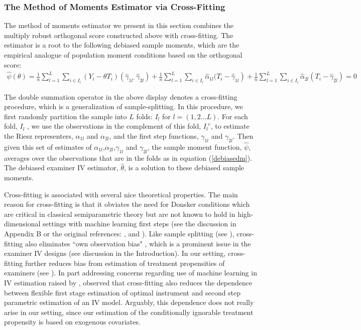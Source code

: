 \subsubsection{The Method of Moments Estimator via Cross-Fitting} \label{mom_est}
The method of moments estimator we present in this section combines the multiply robust orthogonal score constructed above with cross-fitting. The estimator is a root to the following debiased sample moments, which are the empirical analogue of population moment conditions based on the orthogonal score: 
\begin{align} \label{debiasedm}
\hat{\psi}(\theta)=\frac{1}{n} \sum_{l=1}^L \sum_{i \in I_{l}}(Y_i-\theta T_i)\left(\hat{\gamma}_{1 l^{-}}\right. \left.\hat{\gamma}_{2 l}\right)+\frac{1}{n} \sum_{l=1}^L \sum_{i \in I_{l}} \hat{\alpha}_{1 l}(T_i- \left.\hat{\gamma}_{1 l}\right)+\frac{1}{n} \sum_{l=1}^L \sum_{i \in I_{l}} \hat{\alpha}_{2 l}\left(T_i-\hat{\gamma}_{2 l}\right)=0
\end{align}

The double summation operator in the above display denotes a cross-fitting procedure, which is a generalization of sample-splitting. In this procedure, we first randomly partition the sample into $L$ folds: $I_l$ for $l=(1,2 \ldots L)$. For each fold, $I_l$ , we use the observations in the complement of this fold, ${I_l}^c$,  to estimate the Riesz representers, $\alpha_{1 l}$ and $\alpha_{2 l}$, and the first step functions, $\gamma_{1 l}$ and $\gamma_{2 l}$. Then given this set of estimates of $\alpha_{1 l}$,$\alpha_{2 l}$,$\gamma_{1 l}$ and $\gamma_{2 l}$, the sample moment function, $\hat{\psi}$, averages over the observations that are in the folds as in equation (\ref{debiasedm}). The debiased examiner IV estimator, $\hat{\theta}$, is a solution to these debiased sample moments.  

Cross-fitting is associated with several nice theoretical properties. The main reason for cross-fitting is that it obviates the need for Donsker conditions which are critical in classical semiparametric theory but are not known to hold in high-dimensional settings with machine learning first steps (see the discussion in Appendix B or the original references: \citet{chernozhukov2018double}, \citet{chernozhukov2022debiased} and \citet{chernozhukov2022locally}).  Like sample splitting (see \citet{angrist1999jackknife}), cross-fitting also eliminates ``own observation bias" \citep{chernozhukov2022locally}, which is a prominent issue in the examiner IV designs (see discussion in the Introduction). In our setting, cross-fitting further reduces bias from estimation of treatment propensities of examiners (see \citet{jochmans2023many}). In part addressing concerns regarding use of machine learning in IV estimation raised by \citet{angrist2022machine}, \citet{mikusheva2021many} observed that cross-fitting also reduces the dependence between flexible first stage estimation of optimal instrument and second step parametric estimation of an IV model. Arguably, this dependence does not really arise in our setting, since our estimation of the conditionally ignorable treatment propensity is based on exogenous covariates. 

